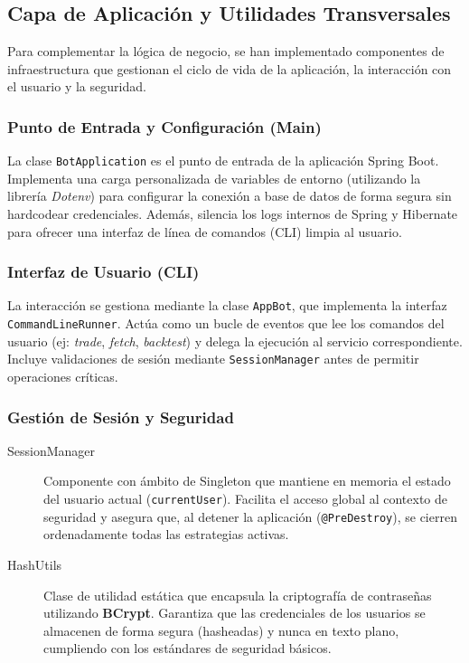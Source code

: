 \documentclass[12pt, letterpaper]{article}
\begin{document}
\subsection{Capa de Aplicación y Utilidades Transversales}

Para complementar la lógica de negocio, se han implementado componentes de infraestructura que gestionan el ciclo de vida de la aplicación, la interacción con el usuario y la seguridad.

\subsubsection{Punto de Entrada y Configuración (Main)}
La clase \texttt{BotApplication} es el punto de entrada de la aplicación Spring Boot. Implementa una carga personalizada de variables de entorno (utilizando la librería \textit{Dotenv}) para configurar la conexión a base de datos de forma segura sin hardcodear credenciales. Además, silencia los logs internos de Spring y Hibernate para ofrecer una interfaz de línea de comandos (CLI) limpia al usuario.

\subsubsection{Interfaz de Usuario (CLI)}
La interacción se gestiona mediante la clase \texttt{AppBot}, que implementa la interfaz \texttt{CommandLineRunner}. Actúa como un bucle de eventos que lee los comandos del usuario (ej: \textit{trade}, \textit{fetch}, \textit{backtest}) y delega la ejecución al servicio correspondiente. Incluye validaciones de sesión mediante \texttt{SessionManager} antes de permitir operaciones críticas.

\subsubsection{Gestión de Sesión y Seguridad}
\begin{description}
    \item[SessionManager] Componente con ámbito de Singleton que mantiene en memoria el estado del usuario actual (\texttt{currentUser}). Facilita el acceso global al contexto de seguridad y asegura que, al detener la aplicación (\texttt{@PreDestroy}), se cierren ordenadamente todas las estrategias activas.
    
    \item[HashUtils] Clase de utilidad estática que encapsula la criptografía de contraseñas utilizando \textbf{BCrypt}. Garantiza que las credenciales de los usuarios se almacenen de forma segura (hasheadas) y nunca en texto plano, cumpliendo con los estándares de seguridad básicos.
\end{description}
\end{document}
